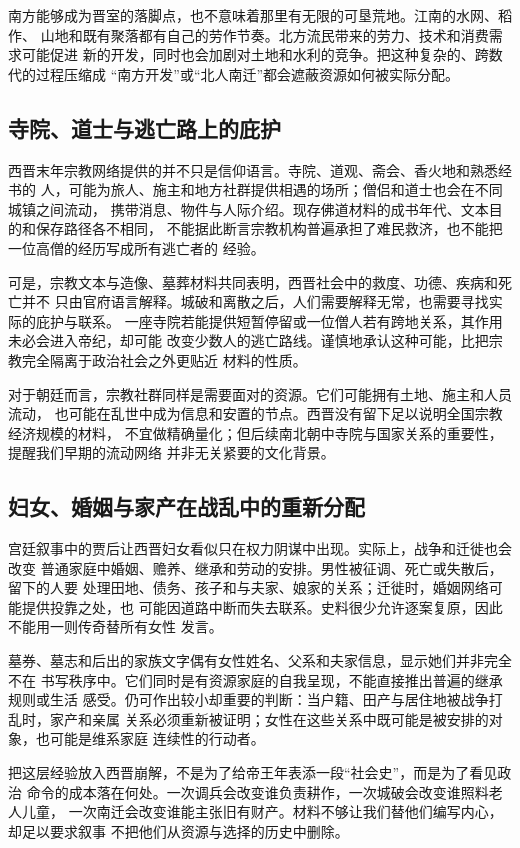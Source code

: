 南方能够成为晋室的落脚点，也不意味着那里有无限的可垦荒地。江南的水网、稻作、
山地和既有聚落都有自己的劳作节奏。北方流民带来的劳力、技术和消费需求可能促进
新的开发，同时也会加剧对土地和水利的竞争。把这种复杂的、跨数代的过程压缩成
“南方开发”或“北人南迁”都会遮蔽资源如何被实际分配。

\subsection{寺院、道士与逃亡路上的庇护}

西晋末年宗教网络提供的并不只是信仰语言。寺院、道观、斋会、香火地和熟悉经书的
人，可能为旅人、施主和地方社群提供相遇的场所；僧侣和道士也会在不同城镇之间流动，
携带消息、物件与人际介绍。现存佛道材料的成书年代、文本目的和保存路径各不相同，
不能据此断言宗教机构普遍承担了难民救济，也不能把一位高僧的经历写成所有逃亡者的
经验。

可是，宗教文本与造像、墓葬材料共同表明，西晋社会中的救度、功德、疾病和死亡并不
只由官府语言解释。城破和离散之后，人们需要解释无常，也需要寻找实际的庇护与联系。
一座寺院若能提供短暂停留或一位僧人若有跨地关系，其作用未必会进入帝纪，却可能
改变少数人的逃亡路线。谨慎地承认这种可能，比把宗教完全隔离于政治社会之外更贴近
材料的性质。

对于朝廷而言，宗教社群同样是需要面对的资源。它们可能拥有土地、施主和人员流动，
也可能在乱世中成为信息和安置的节点。西晋没有留下足以说明全国宗教经济规模的材料，
不宜做精确量化；但后续南北朝中寺院与国家关系的重要性，提醒我们早期的流动网络
并非无关紧要的文化背景。

\subsection{妇女、婚姻与家产在战乱中的重新分配}

宫廷叙事中的贾后让西晋妇女看似只在权力阴谋中出现。实际上，战争和迁徙也会改变
普通家庭中婚姻、赡养、继承和劳动的安排。男性被征调、死亡或失散后，留下的人要
处理田地、债务、孩子和与夫家、娘家的关系；迁徙时，婚姻网络可能提供投靠之处，也
可能因道路中断而失去联系。史料很少允许逐案复原，因此不能用一则传奇替所有女性
发言。

墓券、墓志和后出的家族文字偶有女性姓名、父系和夫家信息，显示她们并非完全不在
书写秩序中。它们同时是有资源家庭的自我呈现，不能直接推出普遍的继承规则或生活
感受。仍可作出较小却重要的判断：当户籍、田产与居住地被战争打乱时，家产和亲属
关系必须重新被证明；女性在这些关系中既可能是被安排的对象，也可能是维系家庭
连续性的行动者。

把这层经验放入西晋崩解，不是为了给帝王年表添一段“社会史”，而是为了看见政治
命令的成本落在何处。一次调兵会改变谁负责耕作，一次城破会改变谁照料老人儿童，
一次南迁会改变谁能主张旧有财产。材料不够让我们替他们编写内心，却足以要求叙事
不把他们从资源与选择的历史中删除。

